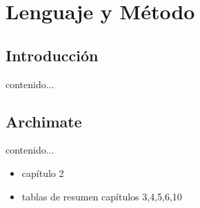 \chapter{Lenguaje y Método}
\section{Introducción}
contenido...
\newpage
\section{Archimate}
contenido...  
\begin{itemize}
	\item capítulo 2
	\item tablas de resumen capítulos 3,4,5,6,10
\end{itemize}

\newpage
